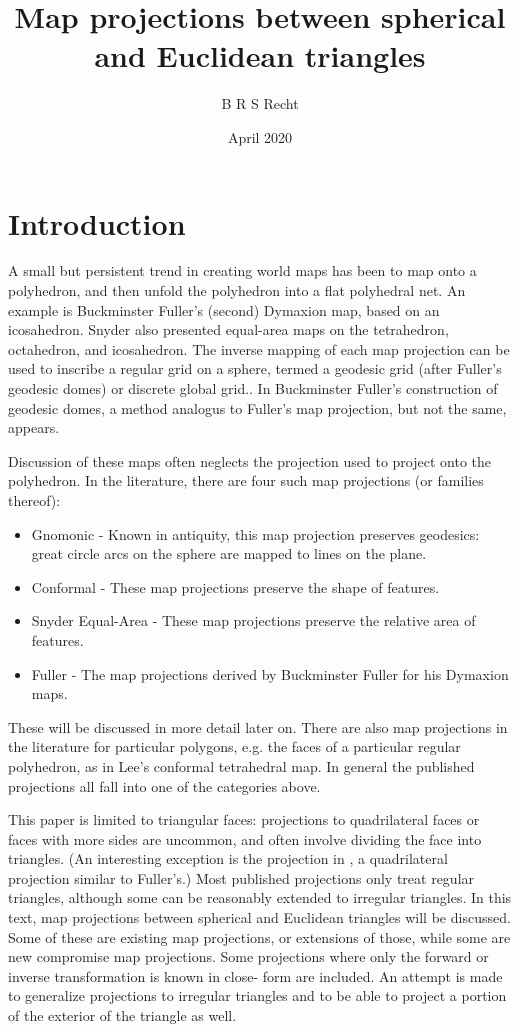 \documentclass{amsart}[12pt]
\title{Map projections between spherical and Euclidean triangles}
\author{B R S Recht}
\date{April 2020}
\begin{document}
\maketitle
\tableofcontents

\section{Introduction}
A small but persistent trend in creating world maps has been to map onto a
polyhedron, and then unfold the polyhedron into a flat polyhedral net. An
example is Buckminster Fuller's (second) Dymaxion map, based on an
icosahedron.\cite{gray94} Snyder also presented equal-area maps on the
tetrahedron, octahedron, and icosahedron.\cite{snyder92} The inverse mapping of
each map projection can be used to inscribe a regular grid on a sphere, termed
a geodesic grid (after Fuller's geodesic domes) or discrete global
grid.\cite{williams}\cite{sahr98}. In Buckminster Fuller's construction of
geodesic domes, a method analogus to Fuller's map projection, but not the same,
appears.\cite{kenner}

Discussion of these maps often neglects the projection used to project onto the
polyhedron. In the literature, there are four such map projections
(or families thereof):
\begin{itemize}
\item Gnomonic - Known in antiquity, this map projection preserves geodesics:
  great circle arcs on the sphere are mapped to lines on the plane.
\item Conformal - These map projections preserve the shape of features.
\item Snyder Equal-Area - These map projections preserve the relative area of
  features.\cite{snyder92}
\item Fuller - The map projections derived by Buckminster Fuller
  for his Dymaxion maps.\cite{gray94}\cite{gray95}\cite{crider08}
\end{itemize}
These will be discussed in more detail later on. There are also map projections
in the literature for particular polygons, e.g. the faces of a particular
regular polyhedron, as in Lee's conformal tetrahedral map.\cite{lee} In general
the published projections all fall into one of the categories above.

This paper is limited to triangular faces: projections to quadrilateral faces
or faces with more sides are uncommon, and often involve dividing the face into
triangles. (An interesting exception is the projection in \cite{crider09}, a
quadrilateral projection similar to Fuller's.) Most published projections only
treat regular triangles, although some can be reasonably extended to irregular
triangles. In this text, map projections between spherical and Euclidean
triangles will be discussed. Some of these are existing map projections, or
extensions of those, while some are new compromise map projections. Some
projections where only the forward or inverse transformation is known in close-
form are included. An attempt is made to generalize projections to irregular
triangles and to be able to project a portion of the exterior of the triangle
as well.
\end{document}
